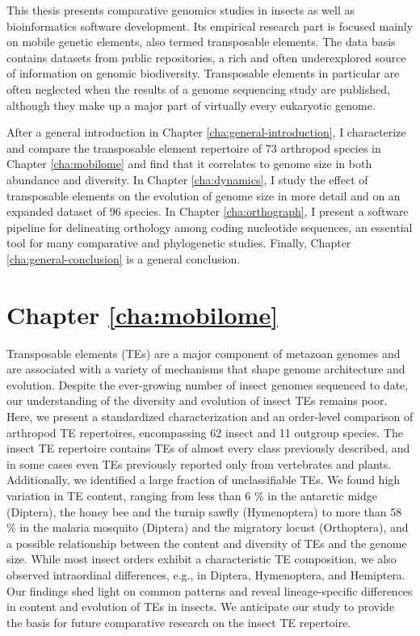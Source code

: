 

This thesis presents comparative genomics studies in insects as well as
bioinformatics software development. Its empirical research part is
focused mainly on mobile genetic elements, also termed transposable
elements. The data basis contains datasets from public repositories, a
rich and often underexplored source of information on genomic
biodiversity. Transposable elements in particular are often neglected
when the results of a genome sequencing study are published, although
they make up a major part of virtually every eukaryotic genome. 

After a general introduction in Chapter \ref{cha:general-introduction}, I
characterize and compare the transposable element repertoire of 73
arthropod species in Chapter \ref{cha:mobilome} and find that it
correlates to genome size in both abundance and diversity. In Chapter
\ref{cha:dynamics}, I study the effect of transposable elements on the
evolution of genome size in more detail and on an expanded dataset of 96
species. In Chapter \ref{cha:orthograph}, I present a software
pipeline for delineating orthology among coding nucleotide sequences, an
essential tool for many comparative and phylogenetic studies. Finally,
Chapter \ref{cha:general-conclusion} is a general conclusion.

\section*{Chapter \ref{cha:mobilome}}

Transposable elements (TEs) are a major component of metazoan genomes
and are associated with a variety of mechanisms that shape genome
architecture and evolution. Despite the ever-growing number of insect
genomes sequenced to date, our understanding of the diversity and
evolution of insect TEs remains poor. Here, we present a standardized
characterization and an order-level comparison of arthropod TE
repertoires, encompassing 62 insect and 11 outgroup species. The insect
TE repertoire contains TEs of almost every class previously described,
and in some cases even TEs previously reported only from vertebrates and
plants. Additionally, we identified a large fraction of unclassifiable
TEs. We found high variation in TE content, ranging from less than 6 \%
in the antarctic midge (Diptera), the honey bee and the turnip sawfly
(Hymenoptera) to more than 58 \% in the malaria mosquito (Diptera) and
the migratory locust (Orthoptera), and a possible relationship between
the content and diversity of TEs and the genome size. While most insect
orders exhibit a characteristic TE composition, we also observed
intraordinal differences, e.g., in Diptera, Hymenoptera, and Hemiptera.
Our findings shed light on common patterns and reveal lineage-specific
differences in content and evolution of TEs in insects. We anticipate
our study to provide the basis for future comparative research on the
insect TE repertoire.%

